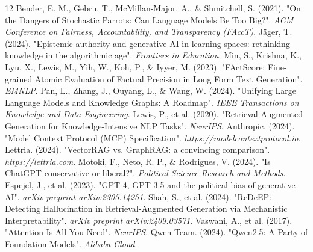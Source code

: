 \documentclass[10pt, a4paper, twocolumn]{article}
\begin{document}
\begin{thebibliography}{12}
     Bender, E. M., Gebru, T., McMillan-Major, A., \& Shmitchell, S. (2021). "On the Dangers of Stochastic Parrots: Can Language Models Be Too Big?". \textit{ACM Conference on Fairness, Accountability, and Transparency (FAccT)}.
     Jäger, T. (2024). "Epistemic authority and generative AI in learning spaces: rethinking knowledge in the algorithmic age". \textit{Frontiers in Education}.
     Min, S., Krishna, K., Lyu, X., Lewis, M., Yih, W., Koh, P., \& Iyyer, M. (2023). "FActScore: Fine-grained Atomic Evaluation of Factual Precision in Long Form Text Generation". \textit{EMNLP}.
     Pan, L., Zhang, J., Ouyang, L., \& Wang, W. (2024). "Unifying Large Language Models and Knowledge Graphs: A Roadmap". \textit{IEEE Transactions on Knowledge and Data Engineering}.
     Lewis, P., et al. (2020). "Retrieval-Augmented Generation for Knowledge-Intensive NLP Tasks". \textit{NeurIPS}.
     Anthropic. (2024). "Model Context Protocol (MCP) Specification". \textit{https://modelcontextprotocol.io}.
     Lettria. (2024). "VectorRAG vs. GraphRAG: a convincing comparison". \textit{https://lettria.com}.
     Motoki, F., Neto, R. P., \& Rodrigues, V. (2024). "Is ChatGPT conservative or liberal?". \textit{Political Science Research and Methods}.
     Espejel, J., et al. (2023). "GPT-4, GPT-3.5 and the political bias of generative AI". \textit{arXiv preprint arXiv:2305.14251}.
     Shah, S., et al. (2024). "ReDeEP: Detecting Hallucination in Retrieval-Augmented Generation via Mechanistic Interpretability". \textit{arXiv preprint arXiv:2409.03571}.
     Vaswani, A., et al. (2017). "Attention Is All You Need". \textit{NeurIPS}.
     Qwen Team. (2024). "Qwen2.5: A Party of Foundation Models". \textit{Alibaba Cloud}.
\end{thebibliography}
\end{document}
